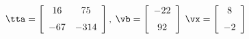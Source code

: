 {$\tta = \left[ \begin {array}{cc} 16&75\\\noalign{\medskip}-67&-314
\end {array} \right],$
 \quad
$\vb = \left[ \begin {array}{c} -22\\\noalign{\medskip}92\end {array}
 \right]$ 
}
{$\vx = \left[ \begin {array}{c} 8\\\noalign{\medskip}-2\end {array} \right] $}
 